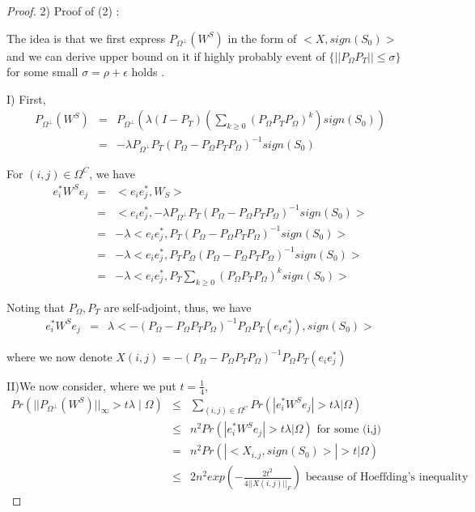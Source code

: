 \begin{proof}
2) Proof of (2) :

The idea is that we first express $P_{\Omega^{\bot}}(W^{S})$ in the form of $<X,sign(S_{0})>$and we can derive upper bound on it if highly probably event of $\{||P_{\Omega}P_{T}||\le\sigma\}$ for some small $\sigma=\rho+\epsilon$ holds . 

I) First, 
\begin{eqnarray*}
P_{\Omega^{\bot}}(W^{S}) & = & P_{\Omega^{\bot}}(\lambda(I-P_{T})(\sum_{k\ge0}(P_{\Omega}P_{T}P_{\Omega})^{k})sign(S_{0}))\\
 & = & -\lambda P_{\Omega^{\bot}}P_{T}(P_{\Omega}-P_{\Omega}P_{T}P_{\Omega})^{-1}sign(S_{0})
\end{eqnarray*}


For $(i,j)\in\Omega^{C}$, we have 
\begin{eqnarray*}
e_{i}^{*}W^{S}e_{j} & = & <e_{i}e_{j}^{*},W_{S}>\\
 & = & <e_{i}e_{j}^{*},-\lambda P_{\Omega^{\bot}}P_{T}(P_{\Omega}-P_{\Omega}P_{T}P_{\Omega})^{-1}sign(S_{0})>\\
 & = & -\lambda<e_{i}e_{j}^{*},P_{T}(P_{\Omega}-P_{\Omega}P_{T}P_{\Omega})^{-1}sign(S_{0})>\\
 & = & -\lambda<e_{i}e_{j}^{*},P_{T}P_{\Omega}(P_{\Omega}-P_{\Omega}P_{T}P_{\Omega})^{-1}sign(S_{0})>\\
 & = & -\lambda<e_{i}e_{j}^{*},P_{T}\sum_{k\ge0}(P_{\Omega}P_{T}P_{\Omega})^{k}sign(S_{0})>
\end{eqnarray*}


Noting that $P_{\Omega},P_{T}$ are self-adjoint, thus, we have 
\begin{eqnarray*}
e_{i}^{*}W^{S}e_{j} & = & \lambda<-(P_{\Omega}-P_{\Omega}P_{T}P_{\Omega})^{-1}P_{\Omega}P_{T}(e_{i}e_{j}^{*}),sign(S_{0})>
\end{eqnarray*}


where we now denote $X(i,j)=-(P_{\Omega}-P_{\Omega}P_{T}P_{\Omega})^{-1}P_{\Omega}P_{T}(e_{i}e_{j}^{*})$

II)We now consider, where we put $t=\frac{1}{4}$, 
\begin{eqnarray*}
Pr(||P_{\Omega^{\bot}}(W^{S})||_{\infty}>t\lambda\mid\Omega) & \le & \sum_{(i,j)\in\Omega^{C}}Pr(|e_{i}^{*}W^{S}e_{j}|>t\lambda|\Omega)\\
 & \le & n^{2}Pr(|e_{i}^{*}W^{S}e_{j}|>t\lambda|\Omega)\text{ for some (i,j)}\\
 & = & n^{2}Pr(|<X_{i,j},sign(S_{0})>|>t|\Omega)\\
 & \le & 2n^{2}exp(-\frac{2t^{2}}{4||X(i,j)||_{F}})\text{ because of Hoeffding's inequality}
\end{eqnarray*}



\end{proof}
